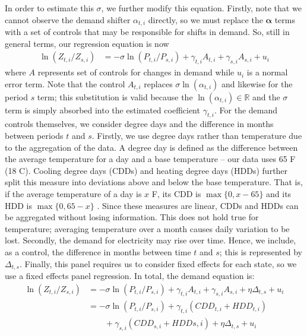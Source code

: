 \documentclass[11pt,a4paper,leqno]{extarticle}
\begin{document}
	In order to estimate this $\sigma$, we further modify this equation. 
	Firstly, note that we cannot observe the demand shifter $\alpha_{t,i}$ directly, so we must replace the $\boldsymbol{\alpha}$ terms with a set of controls that may be responsible for shifts in demand. So, still in general terms, our regression equation is now
	\begin{align*}
	\ln (Z_{t, i} / Z_{ s, i}) &= -\sigma \ln (P_{t,i} / P_{s,i}) +  \gamma_{t,i} A_{t,i} + \gamma_{s,i} A_{s,i} + u_i
	\end{align*}
	where $A$ represents set of controls for changes in demand while $u_i$ is a normal error term. Note that the control  $A_{t,i}$ replaces $\sigma \ln(\alpha_{t,i})$ and likewise for the period $s$ term; this substitution is valid because the $\ln(\alpha_{t,i}) \in \mathbb{R}$ and the $\sigma$ term is simply absorbed into the estimated coefficient $\gamma_{t,i}$. For the demand controls themselves, we consider degree days and the difference in months between periods $t$ and $s$. Firstly, we use degree days rather than temperature due to the aggregation of the data. A degree day is defined as the difference between the average temperature for a day and a base temperature -- our data uses 65 \degree F (18 \degree C). Cooling degree days (CDDs) and heating degree days (HDDs) further split this measure into deviations above and below the base temperature. That is, if the average temperature of a day is $x$ \degree F, its CDD is $\max \{0, x-65\}$ and its HDD is $\max \{0, 65-x\}$ . Since these measures are linear, CDDs and HDDs can be aggregated without losing information. This does not hold true for temperature; averaging temperature over a month causes daily variation to be lost. Secondly, the demand for electricity may rise over time. Hence, we include, as a control, the difference in months between time $t$ and $s$; this is represented by $\Delta_{t,s}$. Finally, this panel requires us to consider fixed effects for each state, so we use a fixed effects panel regression. In total, the demand equation is:
	\begin{align*}
	\ln (Z_{ t, i} / Z_{ s, i}) &= -\sigma \ln (P_{t,i} / P_{s,i}) +  \gamma_{t,i} A_{t,i} + \gamma_{s,i} A_{s,i} + \eta \Delta_{t,s} + u_i \\
	&= -\sigma \ln (P_{t,i} / P_{s,i}) +  \gamma_{t,i} \left( CDD_{t,i} + HDD_{t,i} \right) \\
	&\qquad + \gamma_{s,i} \left( CDD_{s,i} + HDD{s,i} \right)  + \eta \Delta_{t,s} + u_i
	\end{align*}
	
\end{document}
